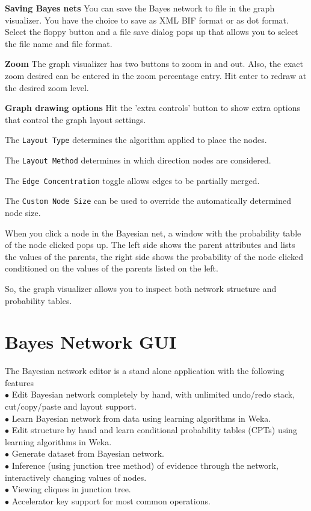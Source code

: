 {\bf Saving Bayes nets} You can save the Bayes network to file in the graph visualizer.
You have the choice to save as XML BIF format or as dot format. Select the floppy button
and a file save dialog pops up that allows you to select the file name and file format.

{\bf Zoom} The graph visualizer has two buttons to zoom in and out. Also, the exact zoom
desired can be entered in the zoom percentage entry. Hit enter to redraw at the desired zoom
level.

{\bf Graph drawing options} Hit the 'extra controls' button to show extra options that
control the graph layout settings.

\begin{center}
\end{center}

The {\tt Layout Type} determines the algorithm applied to place the nodes.

The {\tt Layout Method} determines in which direction nodes are considered.

The {\tt Edge Concentration} toggle allows edges to be partially merged.

The {\tt Custom Node Size} can be used to override the automatically determined node size.

When you click a node in the Bayesian net, a window with the probability table of the node 
clicked pops up. The left side shows the parent attributes and lists the values of the
parents, the right side shows the probability of the node clicked conditioned on the 
values of the parents listed on the left.

\begin{center}
\end{center}

So, the graph visualizer allows you to inspect both network structure and probability tables. 

\section{Bayes Network GUI}

The Bayesian network editor is a stand alone application with the following features\\
$\bullet$ Edit Bayesian network completely by hand, with unlimited undo/redo stack,
cut/copy/paste and layout support.\\
$\bullet$ Learn Bayesian network from data using learning algorithms in Weka.\\
$\bullet$ Edit structure by hand and learn conditional probability tables (CPTs) using learning algorithms in Weka.\\
$\bullet$ Generate dataset from Bayesian network.\\
$\bullet$ Inference (using junction tree method) of evidence through the network,
interactively changing values of nodes.\\
$\bullet$ Viewing cliques in junction tree.\\
$\bullet$ Accelerator key support for most common operations.\\


